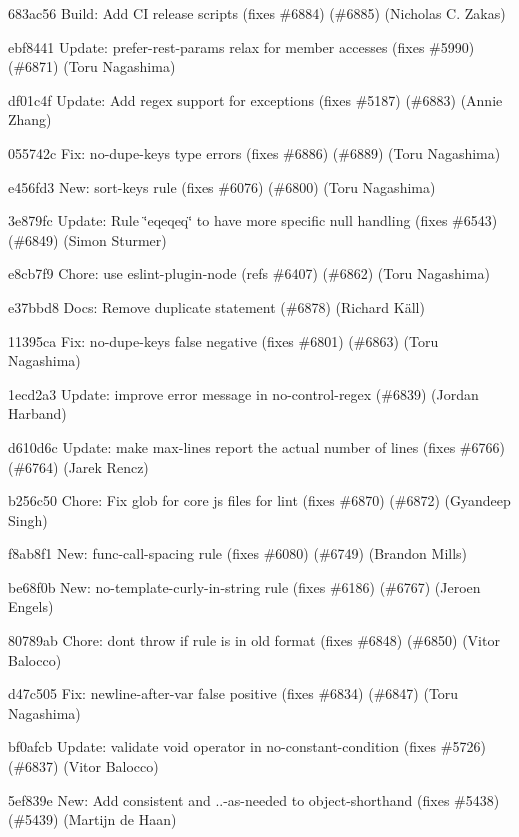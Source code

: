 \begin{DoxyItemize}
\item 683ac56 Build\+: Add CI release scripts (fixes \#6884) (\#6885) (Nicholas C. Zakas)
\item ebf8441 Update\+: {\ttfamily prefer-\/rest-\/params} relax for member accesses (fixes \#5990) (\#6871) (Toru Nagashima)
\item df01c4f Update\+: Add regex support for exceptions (fixes \#5187) (\#6883) (Annie Zhang)
\item 055742c Fix\+: {\ttfamily no-\/dupe-\/keys} type errors (fixes \#6886) (\#6889) (Toru Nagashima)
\item e456fd3 New\+: {\ttfamily sort-\/keys} rule (fixes \#6076) (\#6800) (Toru Nagashima)
\item 3e879fc Update\+: Rule \char`\"{}eqeqeq\char`\"{} to have more specific null handling (fixes \#6543) (\#6849) (Simon Sturmer)
\item e8cb7f9 Chore\+: use eslint-\/plugin-\/node (refs \#6407) (\#6862) (Toru Nagashima)
\item e37bbd8 Docs\+: Remove duplicate statement (\#6878) (Richard Käll)
\item 11395ca Fix\+: {\ttfamily no-\/dupe-\/keys} false negative (fixes \#6801) (\#6863) (Toru Nagashima)
\item 1ecd2a3 Update\+: improve error message in {\ttfamily no-\/control-\/regex} (\#6839) (Jordan Harband)
\item d610d6c Update\+: make {\ttfamily max-\/lines} report the actual number of lines (fixes \#6766) (\#6764) (Jarek Rencz)
\item b256c50 Chore\+: Fix glob for core js files for lint (fixes \#6870) (\#6872) (Gyandeep Singh)
\item f8ab8f1 New\+: func-\/call-\/spacing rule (fixes \#6080) (\#6749) (Brandon Mills)
\item be68f0b New\+: no-\/template-\/curly-\/in-\/string rule (fixes \#6186) (\#6767) (Jeroen Engels)
\item 80789ab Chore\+: don\textquotesingle{}t throw if rule is in old format (fixes \#6848) (\#6850) (Vitor Balocco)
\item d47c505 Fix\+: {\ttfamily newline-\/after-\/var} false positive (fixes \#6834) (\#6847) (Toru Nagashima)
\item bf0afcb Update\+: validate void operator in no-\/constant-\/condition (fixes \#5726) (\#6837) (Vitor Balocco)
\item 5ef839e New\+: Add consistent and ..-\/as-\/needed to object-\/shorthand (fixes \#5438) (\#5439) (Martijn de Haan)

\end{DoxyItemize}
